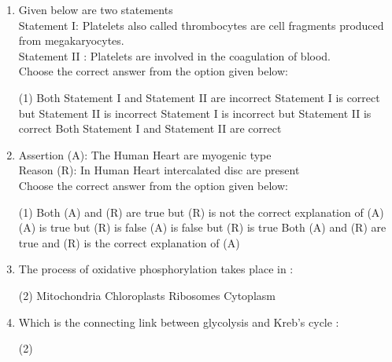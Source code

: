 \documentclass[twocolumn]{article}
\begin{document}
\begin{enumerate}
        \begin{tasks}(1)
            \task Both Statement I and Statement II are incorrect
            \task Statement I is correct but Statement II is incorrect
            \task Statement I is incorrect but Statement II is correct
            \task Both Statement I and Statement II are correct
        \end{tasks}
    \item Given below are two statements\\
    Statement I: Platelets also called thrombocytes are cell fragments produced from megakaryocytes.\\
    Statement II : Platelets are involved in the coagulation of blood.\\
    Choose the correct answer from the option given below:
        \begin{tasks}(1)
            \task Both Statement I and Statement II are incorrect
            \task Statement I is correct but Statement II is incorrect
            \task Statement I is incorrect but Statement II is correct
            \task Both Statement I and Statement II are correct
        \end{tasks}
    \item Assertion (A): The Human Heart are myogenic type\\
    Reason (R): In Human Heart intercalated disc are present\\
    Choose the correct answer from the option given below:
        \begin{tasks}(1)
            \task Both (A) and (R) are true but (R) is not the correct explanation of (A)
            \task (A) is true but (R) is false
            \task (A) is false but (R) is true
            \task Both (A) and (R) are true and (R) is the correct explanation of (A)
        \end{tasks}
    \item The process of oxidative phosphorylation takes place in :
        \begin{tasks}(2)
            \task Mitochondria
            \task Chloroplasts
            \task Ribosomes
            \task Cytoplasm
        \end{tasks}
    \item Which is the connecting link between glycolysis and Kreb's cycle :
        \begin{tasks}(2)

\end{tasks}
\end{enumerate}
\end{document}
